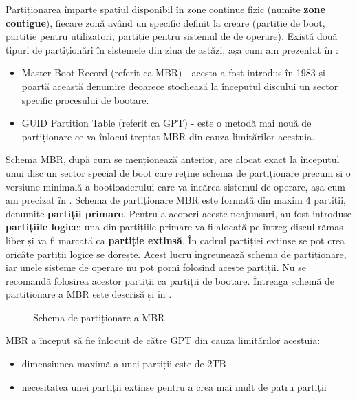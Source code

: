 Partiționarea împarte spațiul disponibil în zone continue fizic (numite \textbf{zone contigue}), fiecare zonă având un specific definit la creare (partiție de boot, partiție pentru utilizatori, partiție pentru sistemul de de operare).
Există două tipuri de partiționări în sistemele din ziua de astăzi, așa cum am prezentat în :

\begin{itemize}
  \item Master Boot Record (referit ca MBR) - acesta a fost introdus în 1983 și poartă această denumire deoarece stochează la începutul discului un sector specific procesului de bootare.
  \item GUID Partition Table (referit ca GPT) - este o metodă mai nouă de partiționare ce va înlocui treptat MBR din cauza limitărilor acestuia.
\end{itemize}

Schema MBR, după cum se menționează anterior, are alocat exact la începutul unui disc un sector special de boot care reține schema de partiționare precum și o versiune minimală a bootloaderului care va încărca sistemul de operare, așa cum am precizat în .
 Schema de partiționare MBR este formată din maxim 4 partiții, denumite \textbf{partiții primare}.
Pentru a acoperi aceste neajunsuri, au fost introduse \textbf{partițiile logice}: una din partițiile primare va fi alocată pe întreg discul rămas liber și va fi marcată ca \textbf{partiție extinsă}.
În cadrul partiției extinse se pot crea oricâte partiții logice se dorește.
Acest lucru îngreunează schema de partiționare, iar unele sisteme de operare nu pot porni folosind aceste partiții.
Nu se recomandă folosirea acestor partiții ca partiții de bootare.
Întreaga schemă de partiționare a MBR este descrisă și în .

\begin{figure}[htbp]
  \centering
  \def\svgwidth{\columnwidth}
  
  \caption{Schema de partiționare a MBR}
  \label{fig:storage:mbr}
\end{figure}

MBR a început să fie înlocuit de către GPT din cauza limitărilor acestuia:

\begin{itemize}
  \item dimensiunea maximă a unei partiții este de 2TB
  \item necesitatea unei partiții extinse pentru a crea mai mult de patru partiții
\end{itemize}

